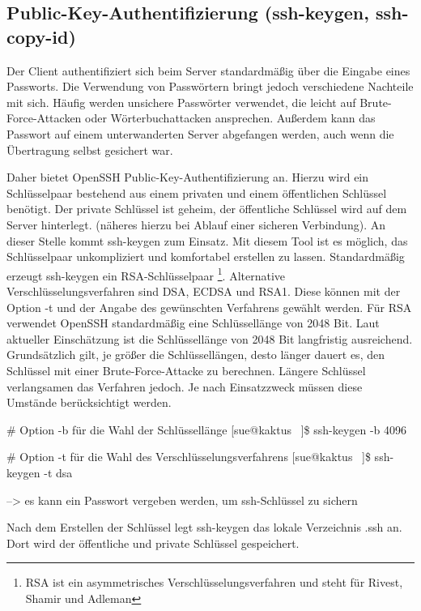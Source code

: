 \documentclass[ngerman,pdf]{wkcms}    %
\begin{document}
\subsection{Public-Key-Authentifizierung (\IT ssh-\IT keygen, \IT ssh-copy-id)}

Der Client authentifiziert sich beim Server standardmäßig über die Eingabe eines Passworts. Die Verwendung von Passwörtern bringt jedoch verschiedene Nachteile mit sich. Häufig werden unsichere Passwörter verwendet, die leicht auf Brute-Force-Attacken oder Wörterbuchattacken ansprechen.\cite{schneier} Außerdem kann das Passwort auf einem unterwanderten Server abgefangen werden, auch wenn die Übertragung selbst gesichert war. \cite[S. 29]{SSH}

Daher bietet OpenSSH \IT Public-Key-Authentifizierung an. Hierzu wird ein Schlüsselpaar bestehend aus einem privaten und einem öffentlichen Schlüssel benötigt. Der private Schlüssel ist geheim, der öffentliche Schlüssel wird auf dem Server hinterlegt. \cite[S. 114]{openssh_book} (näheres hierzu bei Ablauf einer sicheren Verbindung). An dieser Stelle kommt \IT ssh-keygen zum Einsatz. Mit diesem Tool ist es möglich, das Schlüsselpaar unkompliziert und komfortabel erstellen zu lassen. Standardmäßig erzeugt \IT ssh-keygen ein RSA-Schlüsselpaar \footnote{RSA ist ein asymmetrisches Verschlüsselungsverfahren und steht für Rivest, Shamir und Adleman}. Alternative Verschlüsselungsverfahren sind DSA, ECDSA und RSA1. Diese können mit der Option \IT -t und der Angabe des gewünschten Verfahrens gewählt werden. Für RSA verwendet OpenSSH standardmäßig eine Schlüssellänge von 2048 Bit. Laut aktueller Einschätzung ist die Schlüssellänge von 2048 Bit langfristig ausreichend. Grundsätzlich gilt, je größer die Schlüssellängen, desto länger dauert es, den Schlüssel mit einer Brute-Force-Attacke zu berechnen. Längere Schlüssel verlangsamen das Verfahren jedoch. Je nach Einsatzzweck müssen diese Umstände berücksichtigt werden. \cite{bsi} \cite {bsi2}

\begin{program}
# Option -b für die Wahl der Schlüssellänge
[sue@kaktus ~]\$ ssh-keygen -b 4096 

# Option -t für die Wahl des Verschlüsselungsverfahrens
[sue@kaktus ~]\$ ssh-keygen -t dsa

\end{program}

--> es kann ein Passwort vergeben werden, um ssh-Schlüssel zu sichern


Nach dem Erstellen der Schlüssel legt \IT ssh-keygen das lokale Verzeichnis \IT .ssh an. Dort wird der öffentliche und private Schlüssel gespeichert.
\end{document}
